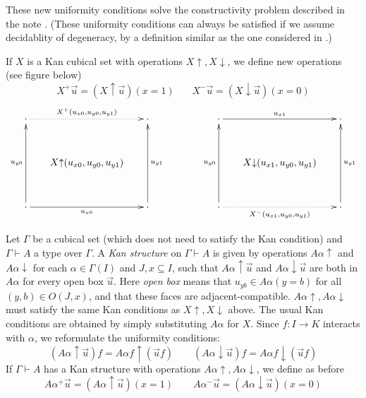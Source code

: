 \documentclass[10pt,a4paper]{article}
\newcommand{\rup}[1]{#1{\uparrow}}
\newcommand{\rdo}[1]{#1{\downarrow}}
\begin{document}
These new uniformity conditions solve the constructivity problem
described in the note \cite{BC}.  (These uniformity conditions can
always be satisfied if we assume decidablity of degeneracy, by a
definition similar as the one considered in \cite{BCH}.)

If $X$ is a Kan cubical set with operations $\rup{X},\rdo{X}$, we
define new operations (see figure below)
$$
X^+\vec u = (\rup{X} \vec u)(x=1)~~~~~~~~X^-\vec u = (\rdo{X} \vec
u)(x=0)$$
\def\noe{\cdot}
\[
\xymatrix@R=1.1cm@C=.6cm{
\noe\ar@{.>}[rr]^{X^+(u_{x0}, u_{y0},u_{y1})}&      & \noe                                     &&&
\noe\ar[rr]^{u_{x1}}                                 &      & \noe      \\
                                      &\rup{X}(u_{x0}, u_{y0},u_{y1})&                          &&&
                                      &\rdo{X}(u_{x1}, u_{y0},u_{y1})&                              \\
\noe\ar[rr]_{u_{x0}}\ar[uu]^{u_{y0}}&      & \noe\ar[uu]_{u_{y1}}                                     &&&
\noe\ar@{.>}[rr]_{X^-(u_{x1}, u_{y0},u_{y1})}\ar[uu]^{u_{y0}}     &      & \noe\ar[uu]_{u_{y1}}                       \\
}
\]


Let $\Gamma$ be a cubical set (which does not need to satisfy the Kan
condition) and $\Gamma\vdash A$ a type over $\Gamma$.  A \emph{Kan
  structure} on $\Gamma \vdash A$ is given by operations $\rup{A
  \alpha}$ and $\rdo{A \alpha}$ for each $\alpha\in\Gamma(I)$ and
$J,x\subseteq I$, such that $\rup{A\alpha} \vec u$ and $\rdo{A\alpha}
\vec u$ are both in $A\alpha$ for every open box $\vec u$.  Here
\emph{open box} means that $u_{yb}\in A\alpha(y=b)$ for all $(y,b)\in
O(J,x)$, and that these faces are adjacent-compatible.
$\rup{A\alpha}, \rdo{A\alpha}$ must satisfy the same Kan conditions as
$ \rup{X},\rdo{X}$ above.  The usual Kan conditions are obtained by
simply substituting $A\alpha$ for $X$.  Since $f:I\to K$ interacts
with $\alpha$, we reformulate the uniformity conditions:
\[
(\rup{A\alpha} \vec u)f = \rup{A\alpha f} (\vec{u}f) \qquad
(\rdo{A\alpha} \vec u)f = \rdo{A\alpha f} (\vec{u}f)
\]
If $\Gamma\vdash A$ has a Kan structure with operations
$\rup{A\alpha},\rdo{A\alpha}$, we define as before
\[
A\alpha^+\vec u = (\rup{A\alpha} \vec u)(x=1) \qquad
A\alpha^-\vec u = (\rdo{A\alpha} \vec u)(x=0)
\]
\end{document}
